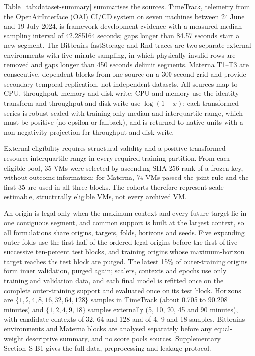 \documentclass[5p,twocolumn]{elsarticle}
\begin{document}
Table~\ref{tab:dataset-summary} summarises the sources. TimeTrack, telemetry
from the OpenAirInterface (OAI) CI/CD system on seven machines between
24 June and 19 July 2024, is framework-development evidence with a measured
median sampling interval of 42.285164 seconds; gaps longer than 84.57 seconds
start a new segment. The Bitbrains fastStorage and Rnd traces are two separate
external environments with five-minute sampling, in which physically invalid
rows are removed and gaps longer than 450 seconds delimit segments. Materna
T1--T3 are consecutive, dependent blocks from one source on a 300-second grid
and provide secondary temporal replication, not independent datasets. All
sources map to CPU, throughput, memory and disk write: CPU and memory use the
identity transform and throughput and disk write use $\log(1+x)$; each
transformed series is robust-scaled with training-only median and
interquartile range, which must be positive (no epsilon or fallback), and is
returned to native units with a non-negativity projection for throughput and
disk write.

External eligibility requires structural validity and a positive
transformed-resource interquartile range in every required training
partition. From each eligible pool, 35 VMs were selected by ascending SHA-256
rank of a frozen key, without outcome information; for Materna, 74 VMs passed
the joint rule and the first 35 are used in all three blocks. The cohorts
therefore represent scale-estimable, structurally eligible VMs, not every
archived VM.

An origin is legal only when the maximum context and every future target lie
in one contiguous segment, and common support is built at the largest
context, so all formulations share origins, targets, folds, horizons and
seeds. Five expanding outer folds use the first half of the ordered legal
origins before the first of five successive ten-percent test blocks, and
training origins whose maximum-horizon target reaches the test block are
purged. The latest 15\% of outer-training origins form inner validation,
purged again; scalers, contexts and epochs use only training and validation
data, and each final model is refitted once on the complete outer-training
support and evaluated once on its test block. Horizons are
$\{1,2,4,8,16,32,64,128\}$ samples in TimeTrack (about 0.705 to 90.208
minutes) and $\{1,2,4,9,18\}$ samples externally (5, 10, 20, 45 and 90
minutes), with candidate contexts of 32, 64 and 128 and of 4, 9 and 18
samples. Bitbrains environments and Materna blocks are analysed separately
before any equal-weight descriptive summary, and no score pools sources.
Supplementary Section~S-B1 gives the full data, preprocessing and leakage
protocol.
\end{document}
